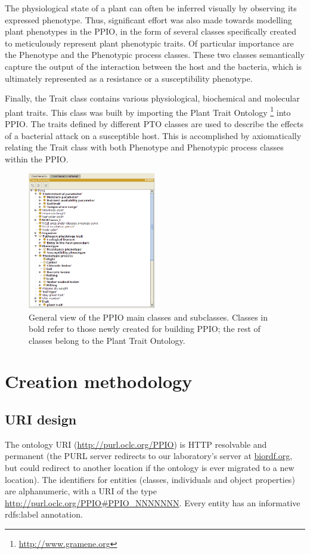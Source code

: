 \documentclass[sw]{iosart2c}
\newcommand{\myurl}[1]{\footnote{\url{#1}}}
\begin{document}
The physiological state of a plant can often be inferred visually by observing its expressed phenotype. Thus, significant effort was also made towards modelling plant phenotypes in the PPIO, in the form of several classes specifically created to meticulously represent plant phenotypic traits. Of particular importance are the {\sf Phenotype} and the {\sf Phenotypic process} classes. These two classes semantically capture the output of the interaction between the host and the bacteria, which is ultimately represented as a resistance or a susceptibility phenotype.

Finally, the {\sf Trait} class contains various physiological, biochemical and molecular plant traits. This class was built by importing the Plant Trait Ontology \myurl{http://www.gramene.org} \cite{PTO} into PPIO. The traits defined by different PTO classes are used to describe the effects of a bacterial attack on a susceptible host. This is accomplished by axiomatically relating the {\sf Trait} class with both {\sf Phenotype} and {\sf Phenotypic process} classes within the PPIO.


\begin{figure}
\includegraphics[width=0.5\textwidth]{PPIO-classes2.png}
\caption{General view of the PPIO main classes and subclasses. Classes in bold refer to those newly created for building PPIO; the rest of classes belong to the Plant Trait Ontology.}\label{fig:ppio-classes}
\end{figure}


\section{Creation methodology}

\subsection{URI design}
The ontology URI (\url{http://purl.oclc.org/PPIO}) is HTTP resolvable and permanent (the PURL server redirects to our laboratory's server at \url{biordf.org}, but could redirect to another location if the ontology is ever migrated to a new location). The identifiers for entities (classes, individuals and object properties) are alphanumeric, with a URI of the type \url{http://purl.oclc.org/PPIO#PPIO_NNNNNNN}. Every entity has an informative {\sf rdfs:label} annotation. 
\end{document}
